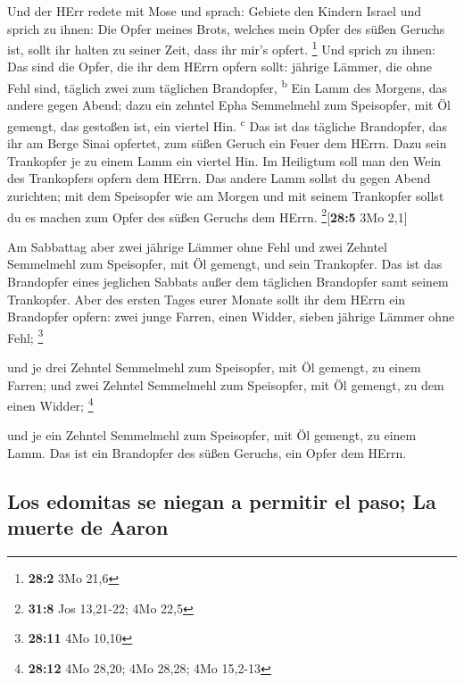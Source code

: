  Und der HErr redete mit Mose und sprach: 
Gebiete den Kindern Israel und sprich zu ihnen: Die Opfer meines Brots,
welches mein Opfer des süßen Geruchs ist, sollt ihr halten zu seiner
Zeit, dass ihr mir's opfert. \footnote{\textbf{28:2} 3Mo 21,6}
 Und sprich zu ihnen: Das sind die Opfer, die ihr dem
HErrn opfern sollt: jährige Lämmer, die ohne Fehl sind, täglich zwei zum
täglichen Brandopfer, \textsuperscript{b}  Ein Lamm des
Morgens, das andere gegen Abend;  dazu ein zehntel Epha
Semmelmehl zum Speisopfer, mit Öl gemengt, das gestoßen ist, ein viertel
Hin. \textsuperscript{c}  Das ist das tägliche Brandopfer,
das ihr am Berge Sinai opfertet, zum süßen Geruch ein Feuer dem HErrn.
 Dazu sein Trankopfer je zu einem Lamm ein viertel Hin. Im
Heiligtum soll man den Wein des Trankopfers opfern dem HErrn.
 Das andere Lamm sollst du gegen Abend zurichten; mit dem
Speisopfer wie am Morgen und mit seinem Trankopfer sollst du es machen
zum Opfer des süßen Geruchs dem HErrn. \footnote{\textbf{31:8} Jos
  13,21-22; 4Mo 22,5}{[}\textbf{28:5} 3Mo 2,1{]}

 Am Sabbattag aber zwei jährige Lämmer ohne Fehl und zwei
Zehntel Semmelmehl zum Speisopfer, mit Öl gemengt, und sein Trankopfer.
 Das ist das Brandopfer eines jeglichen Sabbats außer dem
täglichen Brandopfer samt seinem Trankopfer.  Aber des
ersten Tages eurer Monate sollt ihr dem HErrn ein Brandopfer opfern:
zwei junge Farren, einen Widder, sieben jährige Lämmer ohne Fehl;
\footnote{\textbf{28:11} 4Mo 10,10}

 und je drei Zehntel Semmelmehl zum Speisopfer, mit Öl
gemengt, zu einem Farren; und zwei Zehntel Semmelmehl zum Speisopfer,
mit Öl gemengt, zu dem einen Widder; \footnote{\textbf{28:12} 4Mo 28,20;
  4Mo 28,28; 4Mo 15,2-13}

 und je ein Zehntel Semmelmehl zum Speisopfer, mit Öl
gemengt, zu einem Lamm. Das ist ein Brandopfer des süßen Geruchs, ein
Opfer dem HErrn.

\hypertarget{los-edomitas-se-niegan-a-permitir-el-paso-la-muerte-de-aaron}{%
\subsection{Los edomitas se niegan a permitir el paso; La muerte de
Aaron}\label{los-edomitas-se-niegan-a-permitir-el-paso-la-muerte-de-aaron}}

